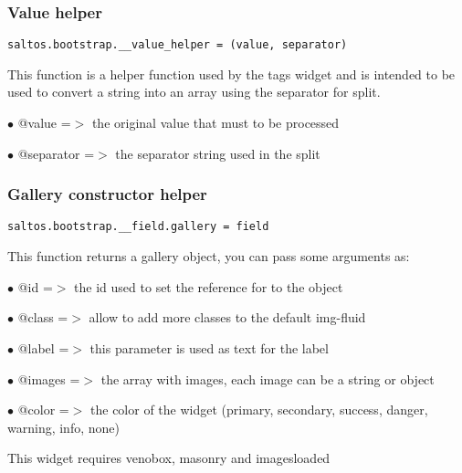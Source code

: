 \documentclass[a4paper]{article}
\begin{document}
\hypertarget{toc641}{}
\subsubsection{Value helper}

\begin{lstlisting}
saltos.bootstrap.__value_helper = (value, separator)
\end{lstlisting}

This function is a helper function used by the tags widget and is intended
to be used to convert a string into an array using the separator for split.

\begin{compactitem}
\item[\color{myblue}$\bullet$] @value     =$>$ the original value that must to be processed
\item[\color{myblue}$\bullet$] @separator =$>$ the separator string used in the split
\end{compactitem}

\hypertarget{toc642}{}
\subsubsection{Gallery constructor helper}

\begin{lstlisting}
saltos.bootstrap.__field.gallery = field
\end{lstlisting}

This function returns a gallery object, you can pass some arguments as:

\begin{compactitem}
\item[\color{myblue}$\bullet$] @id     =$>$ the id used to set the reference for to the object
\item[\color{myblue}$\bullet$] @class  =$>$ allow to add more classes to the default img-fluid
\item[\color{myblue}$\bullet$] @label  =$>$ this parameter is used as text for the label
\item[\color{myblue}$\bullet$] @images =$>$ the array with images, each image can be a string or object
\item[\color{myblue}$\bullet$] @color  =$>$ the color of the widget (primary, secondary, success, danger, warning, info, none)
\end{compactitem}

This widget requires venobox, masonry and imagesloaded
\end{document}
